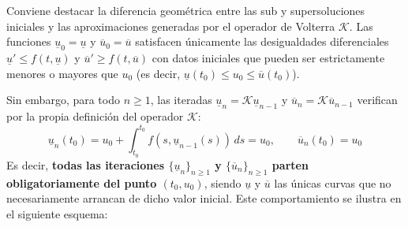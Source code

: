 \begin{observación}
    Conviene destacar la diferencia geométrica entre las sub y supersoluciones iniciales y las aproximaciones generadas por el operador de Volterra $\mathcal{K}$. Las funciones $\underline{u}_0 = \underline{u}$ y $\overline{u}_0 = \overline{u}$ satisfacen únicamente las desigualdades diferenciales $\underline{u}' \leq f(t, \underline{u})$ y $\overline{u}' \geq f(t, \overline{u})$ con datos iniciales que pueden ser estrictamente menores o mayores que $u_0$ (es decir, $\underline{u}(t_0) \leq u_0 \leq \overline{u}(t_0)$). 
    
    Sin embargo, para todo $n \geq 1$, las iteradas $\underline{u}_n = \mathcal{K}\underline{u}_{n-1}$ y $\overline{u}_n = \mathcal{K}\overline{u}_{n-1}$ verifican por la propia definición del operador $\mathcal{K}$:
    \[
        \underline{u}_n(t_0) = u_0 + \int_{t_0}^{t_0} f(s, \underline{u}_{n-1}(s)) \, ds = u_0, \qquad \overline{u}_n(t_0) = u_0
    \]
    Es decir, \textbf{todas las iteraciones $\{\underline{u}_n\}_{n \geq 1}$ y $\{\overline{u}_n\}_{n \geq 1}$ parten obligatoriamente del punto $(t_0, u_0)$}, siendo $\underline{u}$ y $\overline{u}$ las únicas curvas que no necesariamente arrancan de dicho valor inicial. Este comportamiento se ilustra en el siguiente esquema:

    \begin{center}
\end{center}
\end{observación}

